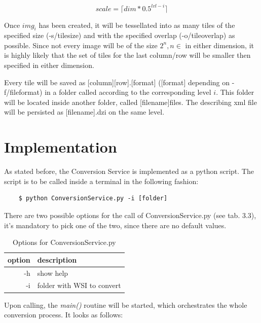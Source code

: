 \begin{equation}
	scale = {\lceil}dim * 0.5^{lvl-i}\rceil
\end{equation}

Once $img_i$ has been created, it will be tessellated into as many tiles of the specified size (-s/tile{\textunderscore}size) and with the specified overlap (-o/tile{\textunderscore}overlap) as possible. Since not every image will be of the size $2^n, n \in $ in either dimension, it is highly likely that the set of tiles for the last column/row will be smaller then specified in either dimension.

Every tile will be saved as [column]{\textunderscore}[row].[format] ([format] depending on -f/file{\textunderscore}format) in a folder called according to the corresponding level $i$. This folder will be located inside another folder, called [filename]{\textunderscore}files. The describing xml file will be persisted as [filename].dzi on the same level.


\section{Implementation}

As stated before, the Conversion Service is implemented as a python script. The script is to be called inside a terminal in the following fashion:

\begin{lstlisting}
	$ python ConversionService.py -i [folder]
\end{lstlisting}

There are two possible options for the call of ConversionService.py (see tab. 3.3), it's mandatory to pick one of the two, since there are no default values.

\begin{table} [h]
	\begin{center}
		\begin{tabular}{| r | l |}
			\hline
			\textbf{option} & \textbf{description} \\ \hline
			-h & show help \\ \hline
			-i & folder with WSI to convert \\ \hline
		\end{tabular}
		\caption{Options for ConversionService.py}
	\end{center}
\end{table}

Upon calling, the \emph{main()} routine will be started, which orchestrates the whole conversion process. It looks as follows:

